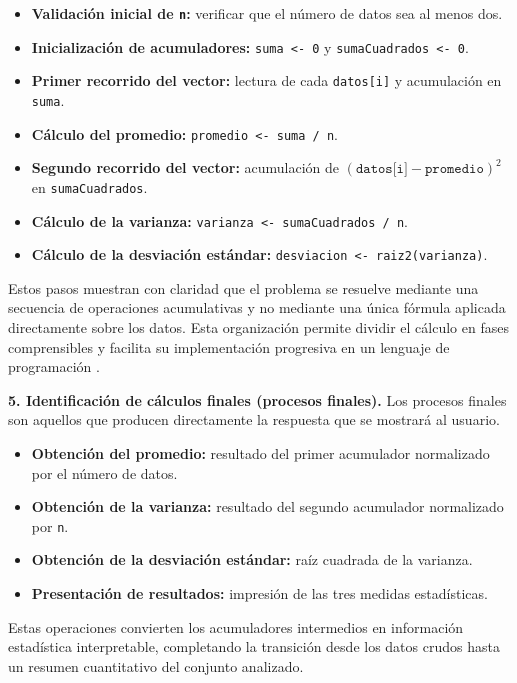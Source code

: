 \documentclass[12pt,twoside]{book}
\begin{document}
					\begin{itemize}
						\item \textbf{Validación inicial de \texttt{n}:} verificar que el número de datos sea al menos dos.
						\item \textbf{Inicialización de acumuladores:} \texttt{suma <- 0} y \texttt{sumaCuadrados <- 0}.
						\item \textbf{Primer recorrido del vector:} lectura de cada \texttt{datos[i]} y acumulación en \texttt{suma}.
						\item \textbf{Cálculo del promedio:} \texttt{promedio <- suma / n}.
						\item \textbf{Segundo recorrido del vector:} acumulación de \((\texttt{datos[i]}-\texttt{promedio})^2\) en \texttt{sumaCuadrados}.
						\item \textbf{Cálculo de la varianza:} \texttt{varianza <- sumaCuadrados / n}.
						\item \textbf{Cálculo de la desviación estándar:} \texttt{desviacion <- raiz2(varianza)}.
					\end{itemize}
					
					\noindent
					Estos pasos muestran con claridad que el problema se resuelve mediante una secuencia de operaciones acumulativas y no mediante una única fórmula aplicada directamente sobre los datos. Esta organización permite dividir el cálculo en fases comprensibles y facilita su implementación progresiva en un lenguaje de programación \cite{Cormen2022Introduction,Sebesta2018Concepts}.
					
					\noindent
					\textbf{5. Identificación de cálculos finales (procesos finales).}
					Los procesos finales son aquellos que producen directamente la respuesta que se mostrará al usuario.
					
					\begin{itemize}
						\item \textbf{Obtención del promedio:} resultado del primer acumulador normalizado por el número de datos.
						\item \textbf{Obtención de la varianza:} resultado del segundo acumulador normalizado por \texttt{n}.
						\item \textbf{Obtención de la desviación estándar:} raíz cuadrada de la varianza.
						\item \textbf{Presentación de resultados:} impresión de las tres medidas estadísticas.
					\end{itemize}
					
					\noindent
					Estas operaciones convierten los acumuladores intermedios en información estadística interpretable, completando la transición desde los datos crudos hasta un resumen cuantitativo del conjunto analizado.
					
\end{document}
